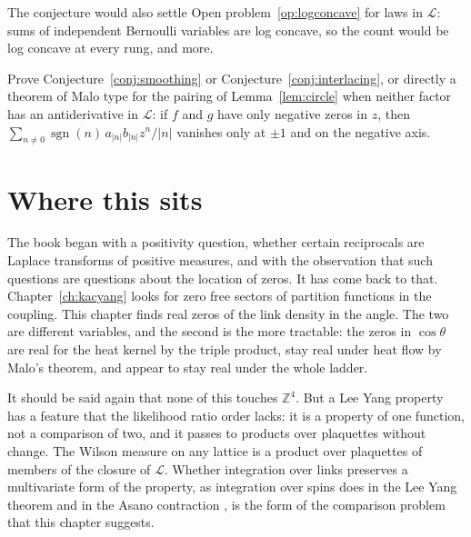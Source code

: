 The conjecture would also settle Open problem~\ref{op:logconcave} for laws in $\mathcal L$: sums of independent Bernoulli variables are log concave, so the count would be log concave at every rung, and more.

\begin{problem}\label{op:malo}
Prove Conjecture~\ref{conj:smoothing} or Conjecture~\ref{conj:interlacing}, or directly a theorem of Malo type for the pairing of Lemma~\ref{lem:circle} when neither factor has an antiderivative in $\mathcal L$: if $f$ and $g$ have only negative zeros in $z$, then $\sum_{n\ne0}\operatorname{sgn}(n)\,a_{|n|}b_{|n|}z^n/|n|$ vanishes only at $\pm1$ and on the negative axis.
\end{problem}

\section{Where this sits}

The book began with a positivity question, whether certain reciprocals are Laplace transforms of positive measures, and with the observation that such questions are questions about the location of zeros. It has come back to that. Chapter~\ref{ch:kacyang} looks for zero free sectors of partition functions in the coupling. This chapter finds real zeros of the link density in the angle. The two are different variables, and the second is the more tractable: the zeros in $\cos\theta$ are real for the heat kernel by the triple product, stay real under heat flow by Malo's theorem, and appear to stay real under the whole ladder.

It should be said again that none of this touches $\mathbb Z^4$. But a Lee Yang property has a feature that the likelihood ratio order lacks: it is a property of one function, not a comparison of two, and it passes to products over plaquettes without change. The Wilson measure on any lattice is a product over plaquettes of members of the closure of $\mathcal L$. Whether integration over links preserves a multivariate form of the property, as integration over spins does in the Lee Yang theorem \cite{LY52} and in the Asano contraction \cite{As70}, is the form of the comparison problem that this chapter suggests.

